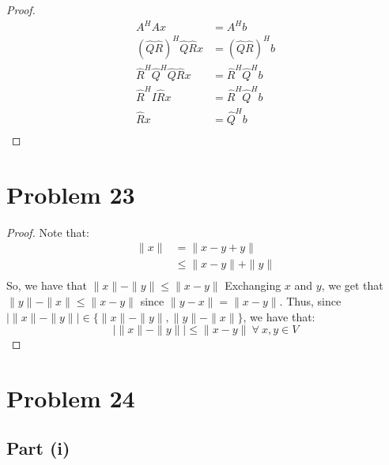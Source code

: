 \documentclass{article}
\begin{document}
\begin{proof}
\begin{align*}
A^{H}Ax &= A^{H}b \\
(\widehat{Q}\widehat{R})^{H}\widehat{Q}\widehat{R}x &= (\widehat{Q}\widehat{R})^{H}b \\
\widehat{R}^{H}\widehat{Q}^{H}\widehat{Q}\widehat{R}x &= \widehat{R}^{H}\widehat{Q}^{H}b \\
\widehat{R}^{H}I\widehat{R}x &= \widehat{R}^{H}\widehat{Q}^{H}b \\
\widehat{R}x &= \widehat{Q}^{H}b \\
\end{align*}
\end{proof}


\section*{Problem 23}

\begin{proof}
Note that:
\begin{align*}
\|x\| &= \|x - y + y\| \\
&\leq \|x - y\| + \|y\| \\
\end{align*}
So, we have that $\|x\| - \|y\| \leq \|x - y\|$ Exchanging $x$ and $y$, we get that $\|y\| - \|x\| \leq \|x - y\|$ since $\|y - x\| = \|x - y\|$. Thus, since $\lvert\|x\| - \|y\|\rvert \in \{\|x\| - \|y\|, \|y\| - \|x\|\}$, we have that:
$$\lvert\|x\| - \|y\|\rvert \leq \|x - y\| \ \forall \ x, y \in V$$
\end{proof}


\section*{Problem 24}

\subsection*{Part (i)}
\end{document}
